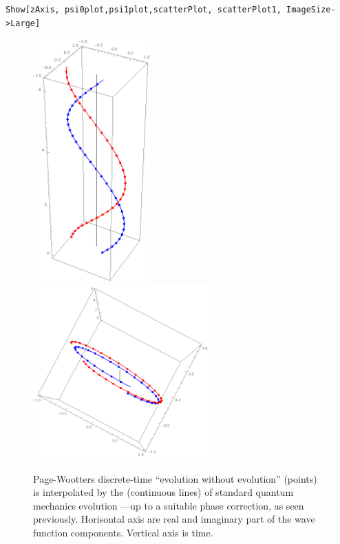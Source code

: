 \begin{lstlisting}
Show[zAxis, psi0plot,psi1plot,scatterPlot, scatterPlot1, ImageSize->Large]
\end{lstlisting}
\begin{figure}
  \centering
  \includegraphics[width=0.4\textwidth]{img/PWfit32.png}
  \includegraphics[width=0.6\textwidth]{img/PWfit32top.png}
  \caption[(from notebook)]{
    Page-Wootters discrete-time ``evolution without evolution'' (points)
    is interpolated by the (continuous lines) of standard quantum mechanics
    evolution ---up to a suitable phase correction, as seen previously.
    Horisontal axis are real and imaginary part of the wave function components.
    Vertical axis is time. 
  }
\end{figure}
